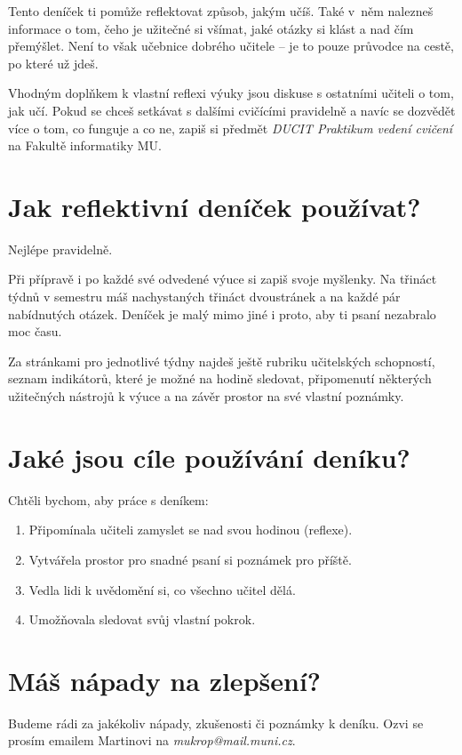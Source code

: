 \documentclass[twoside,openany]{book}
\begin{document}
Tento deníček ti pomůže reflektovat způsob, jakým učíš. Také v~něm nalezneš informace o tom, čeho je užitečné si všímat, jaké otázky si klást a nad čím přemýšlet. Není to však učebnice dobrého učitele -- je to pouze průvodce na cestě, po které už jdeš.

Vhodným doplňkem k vlastní reflexi výuky jsou diskuse s ostatními učiteli o tom, jak učí. Pokud se chceš setkávat s dalšími cvičícími pravidelně a navíc se dozvědět více o tom, co funguje a co ne, zapiš si předmět \textit{DUCIT Praktikum vedení cvičení} na Fakultě informatiky MU.

\newpage
\section*{Jak reflektivní deníček používat?}

Nejlépe pravidelně. 

Při přípravě i po každé své odvedené výuce si zapiš svoje myšlenky. Na třináct týdnů v semestru máš nachystaných třináct dvoustránek a na každé pár nabídnutých otázek. Deníček je malý mimo jiné i proto, aby ti psaní nezabralo moc času.

Za stránkami pro jednotlivé týdny najdeš ještě rubriku učitelských schopností, seznam indikátorů, které je možné na hodině sledovat, připomenutí některých užitečných nástrojů k výuce a na závěr prostor na své vlastní poznámky.

\section*{Jaké jsou cíle používání deníku?}

Chtěli bychom, aby práce s deníkem:
\begin{enumerate}[topsep=0pt]
\item Připomínala učiteli zamyslet se nad svou hodinou (reflexe).
\item Vytvářela prostor pro snadné psaní si poznámek pro příště.
\item Vedla lidi k uvědomění si, co všechno učitel dělá.
\item Umožňovala sledovat svůj vlastní pokrok.
\end{enumerate}

\section*{Máš nápady na zlepšení?}

Budeme rádi za jakékoliv nápady, zkušenosti či poznámky k deníku. Ozvi se prosím emailem Martinovi na \textit{mukrop@mail.muni.cz}.
\end{document}
